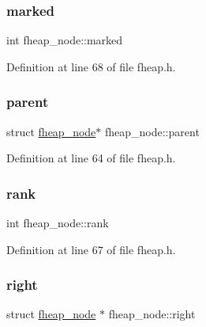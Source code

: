 \mbox{\label{structfheap__node_a157ede2cfd1f97c4b71e6eaf91537b56}} 
\subsubsection{\texorpdfstring{marked}{marked}}
{\footnotesize\ttfamily int fheap\+\_\+node\+::marked}



Definition at line 68 of file fheap.\+h.

\mbox{\label{structfheap__node_a3dc01ed7a15e3eeb6971acf9c1d63e2f}} 
\subsubsection{\texorpdfstring{parent}{parent}}
{\footnotesize\ttfamily struct \mbox{\hyperlink{structfheap__node}{fheap\+\_\+node}}$\ast$ fheap\+\_\+node\+::parent}



Definition at line 64 of file fheap.\+h.

\mbox{\label{structfheap__node_a6e8d65cbe58c9646f5bc2a308f147343}} 
\subsubsection{\texorpdfstring{rank}{rank}}
{\footnotesize\ttfamily int fheap\+\_\+node\+::rank}



Definition at line 67 of file fheap.\+h.

\mbox{\label{structfheap__node_af83e42765eddab9c0288352be54fe907}} 
\subsubsection{\texorpdfstring{right}{right}}
{\footnotesize\ttfamily struct \mbox{\hyperlink{structfheap__node}{fheap\+\_\+node}} $\ast$ fheap\+\_\+node\+::right}



